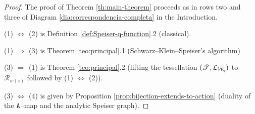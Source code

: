 \documentclass[final,3p,times]{elsarticle}
\newcommand{\R}{\ensuremath{{\mathcal R}}}
\theoremstyle{definition}
\begin{document}
\begin{proof}
The proof of Theorem \ref{th:main-theorem} proceeds as in 
rows two and three of
Diagram \ref{dia:correspondencia-completa} in the Introduction.

\noindent
(1) $\Longleftrightarrow$ (2) is 
Definition \ref{def:Speiser-q-function}.2 (classical).


\noindent
(1) $\Longrightarrow$ (3) is Theorem \ref{teo:principal}.1
(Schwarz--Klein--Speiser's algorithm)

\noindent
(3) $\Longrightarrow$ (1) is Theorem \ref{teo:principal}.2
 (lifting the tessellation $(\mathscr{T},\mathcal{L}_{\mathcal{W}_{\tt q}})$ to $\R_{w(z)}$
 followed by (1) $\Longleftrightarrow$ (2)).

\noindent
(3) $\Longleftrightarrow$ (4) is given by Proposition \ref{prop:bijection-extends-to-action}
(duality of the $\tt A$--map and the analytic Speiser graph).


\end{proof}
\end{document}
